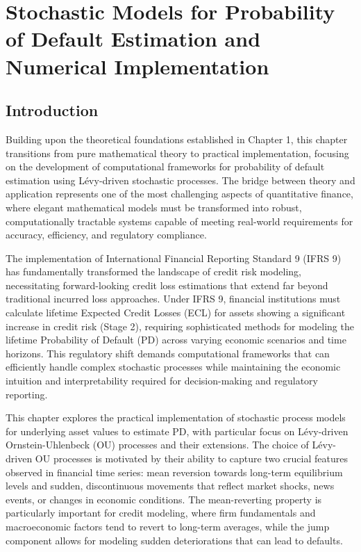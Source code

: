 \documentclass[11pt,twoside,openright]{report}
\begin{document}
\chapter{Stochastic Models for Probability of Default Estimation and Numerical Implementation}

\section{Introduction}

Building upon the theoretical foundations established in Chapter 1, this chapter transitions from pure mathematical theory to practical implementation, focusing on the development of computational frameworks for probability of default estimation using Lévy-driven stochastic processes. The bridge between theory and application represents one of the most challenging aspects of quantitative finance, where elegant mathematical models must be transformed into robust, computationally tractable systems capable of meeting real-world requirements for accuracy, efficiency, and regulatory compliance.

The implementation of International Financial Reporting Standard 9 (IFRS 9) has fundamentally transformed the landscape of credit risk modeling, necessitating forward-looking credit loss estimations that extend far beyond traditional incurred loss approaches. Under IFRS 9, financial institutions must calculate lifetime Expected Credit Losses (ECL) for assets showing a significant increase in credit risk (Stage 2), requiring sophisticated methods for modeling the lifetime Probability of Default (PD) across varying economic scenarios and time horizons. This regulatory shift demands computational frameworks that can efficiently handle complex stochastic processes while maintaining the economic intuition and interpretability required for decision-making and regulatory reporting.

This chapter explores the practical implementation of stochastic process models for underlying asset values to estimate PD, with particular focus on Lévy-driven Ornstein-Uhlenbeck (OU) processes and their extensions. The choice of Lévy-driven OU processes is motivated by their ability to capture two crucial features observed in financial time series: mean reversion towards long-term equilibrium levels and sudden, discontinuous movements that reflect market shocks, news events, or changes in economic conditions. The mean-reverting property is particularly important for credit modeling, where firm fundamentals and macroeconomic factors tend to revert to long-term averages, while the jump component allows for modeling sudden deteriorations that can lead to defaults.
\end{document}
